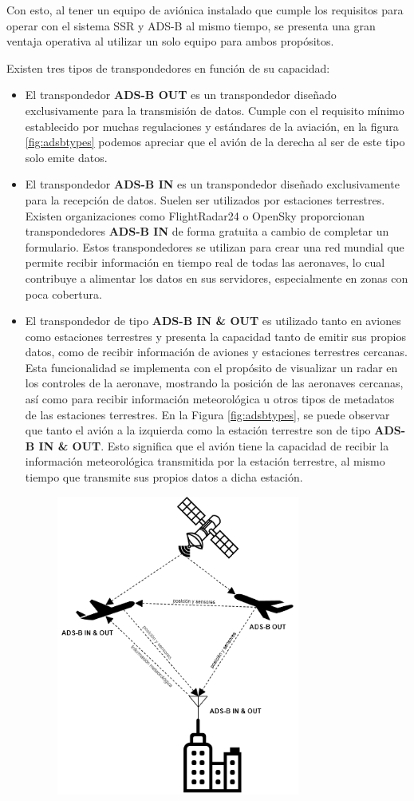 \documentclass[a4paper, 11pt]{book}
\begin{document}
Con esto, al tener un equipo de aviónica instalado que cumple los requisitos para operar con el sistema SSR y ADS-B al mismo tiempo, se presenta una gran ventaja operativa al utilizar un solo equipo para ambos propósitos.

Existen tres tipos de transpondedores en función de su capacidad:
\begin{itemize}
    \item El transpondedor \textbf{ADS-B OUT} es un transpondedor diseñado exclusivamente para la transmisión de datos. Cumple con el requisito mínimo establecido por muchas regulaciones y estándares de la aviación, en la figura \ref{fig:adsbtypes} podemos apreciar que el avión de la derecha al ser de este tipo solo emite datos.
    \item El transpondedor \textbf{ADS-B IN} es un transpondedor diseñado exclusivamente para la recepción de datos. Suelen ser utilizados por estaciones terrestres. Existen organizaciones como FlightRadar24 o OpenSky proporcionan transpondedores \textbf{ADS-B IN} de forma gratuita a cambio de completar un formulario. Estos transpondedores se utilizan para crear una red mundial que permite recibir información en tiempo real de todas las aeronaves, lo cual contribuye a alimentar los datos en sus servidores, especialmente en zonas con poca cobertura.
    \item El transpondedor de tipo \textbf{ADS-B IN \& OUT} es utilizado tanto en aviones como estaciones terrestres y presenta la capacidad tanto de emitir sus propios datos, como de recibir información de aviones y estaciones terrestres cercanas. Esta funcionalidad se implementa con el propósito de visualizar un radar en los controles de la aeronave, mostrando la posición de las aeronaves cercanas, así como para recibir información meteorológica u otros tipos de metadatos de las estaciones terrestres. En la Figura \ref{fig:adsbtypes}, se puede observar que tanto el avión a la izquierda como la estación terrestre son de tipo \textbf{ADS-B IN \& OUT}. Esto significa que el avión tiene la capacidad de recibir la información meteorológica transmitida por la estación terrestre, al mismo tiempo que transmite sus propios datos a dicha estación.
\begin{figure}[H]
  \centering
  \includegraphics[width=8cm, keepaspectratio]{img/adsbtypes.drawio.png}

\end{figure}
\end{itemize}
\end{document}
